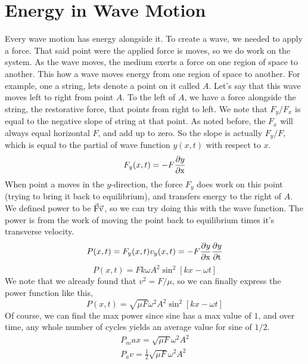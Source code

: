 \newpage
\section{Energy in Wave Motion}
Every wave motion has energy alongside it. To create a wave, we needed to apply a force. That said point were the applied force is moves, so we do work on the system. As the wave moves, the medium exerts a force on one region of space to another. This how a wave moves energy from one region of space to another. For example, one a string, lets denote a point on it called $A$. Let's say that this wave moves left to right from point $A$. To the left of $A$, we have a force alongside the string, the restorative force, that points from right to left. We note that $F_y/F_x$ is equal to the negative slope of string at that point. As noted before, the $F_x$ will always equal horizontal $F$, and add up to zero. So the slope is actually $F_y/F$, which is equal to the partial of wave function $y(x,t)$ with respect to $x$. 
\begin{equation*}
	F_y(x,t) = -F\frac{\partial y}{\partial\mathrm{x}}
\end{equation*}
When point a moves in the $y$-direction, the force $F_y$ does work on this point (trying to bring it back to equilibrium), and transfers energy to the right of $A$. We defined power to be $\vec{\mathrm{F}}\vec{\mathrm{v}}$, so we can try doing this with the wave function. The power is from the work of moving the point back to equilibrium times it's transverse velocity.
\begin{equation*}
	P(x,t) = F_y(x,t)v_y(x,t) = -F\frac{\partial y}{\partial\mathrm{x}}\frac{\partial y}{\partial\mathrm{t}}
\end{equation*}
\begin{equation*}
	P(x,t) = Fk\omega A^2\sin^2\left[ kx - \omega t \right]
\end{equation*}
We note that we already found that $v^2 = F/\mu$, so we can finally express the power function like this,
\begin{equation*}
	P(x,t) = \sqrt{\mu F}\omega^2 A^2 \sin^2\left[ kx - \omega t \right]
\end{equation*}
Of course, we can find the max power since sine has a max value of $1$, and over time, any whole number of cycles yields an average value for sine of $1/2$. 
\begin{align*}
	P_max=\sqrt{\mu F}\omega^2A^2 \\ 
	P_av = \frac{1}{2}\sqrt{\mu F}\omega^2A^2
\end{align*}
